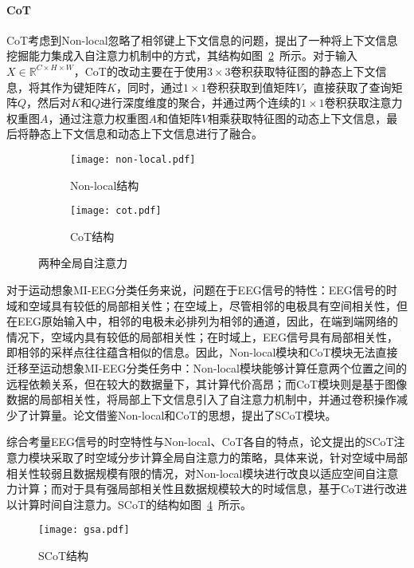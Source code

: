 \paragraph{CoT}

CoT考虑到Non-local忽略了相邻键上下文信息的问题，提出了一种将上下文信息挖掘能力集成入自注意力机制中的方式，其结构如图~\ref{fig:cot}~所示。对于输入\(X \in \mathbb{R}^{C \times H \times W}\)，CoT的改动主要在于使用\(3\times3\)卷积获取特征图的静态上下文信息，将其作为键矩阵\(K\)，同时，通过\(1\times1\)卷积获取到值矩阵\(V\)，直接获取了查询矩阵\(Q\)，然后对\(K\)和\(Q\)进行深度维度的聚合，并通过两个连续的\(1\times1\)卷积获取注意力权重图\(A\)，通过注意力权重图\(A\)和值矩阵\(V\)相乘获取特征图的动态上下文信息，最后将静态上下文信息和动态上下文信息进行了融合。
\begin{figure}[ht]
  \centering
  \begin{subfigure}{0.4\textwidth}
    \texttt{[image: non-local.pdf]}
    \caption{Non-local结构\cite{wang2018non}}
    \label{fig:non-local}
  \end{subfigure}\qquad
  \begin{subfigure}{0.4\textwidth}
    \texttt{[image: cot.pdf]}
    \caption{CoT结构\cite{li2022contextual}}
    \label{fig:cot}
  \end{subfigure}
  \caption{两种全局自注意力}
  \label{fig:self}
\end{figure}

对于运动想象MI-EEG分类任务来说，问题在于EEG信号的特性：EEG信号的时域和空域具有较低的局部相关性；在空域上，尽管相邻的电极具有空间相关性，但在EEG原始输入中，相邻的电极未必排列为相邻的通道，因此，在端到端网络的情况下，空域内具有较低的局部相关性；在时域上，EEG信号具有局部相关性，即相邻的采样点往往蕴含相似的信息。因此，Non-local模块和CoT模块无法直接迁移至运动想象MI-EEG分类任务中：Non-local模块能够计算任意两个位置之间的远程依赖关系，但在较大的数据量下，其计算代价高昂；而CoT模块则是基于图像数据的局部相关性，将局部上下文信息引入了自注意力机制中，并通过卷积操作减少了计算量。论文借鉴Non-local和CoT的思想，提出了SCoT模块。

综合考量EEG信号的时空特性与Non-local、CoT各自的特点，论文提出的SCoT注意力模块采取了时空域分步计算全局自注意力的策略，具体来说，针对空域中局部相关性较弱且数据规模有限的情况，对Non-local模块进行改良以适应空间自注意力计算；而对于具有强局部相关性且数据规模较大的时域信息，基于CoT进行改进以计算时间自注意力。SCoT的结构如图~\ref{fig:gsa}~所示。
\begin{figure}[ht]
    \centering
    \texttt{[image: gsa.pdf]}
    \caption{SCoT结构}
    \label{fig:gsa}
\end{figure}

